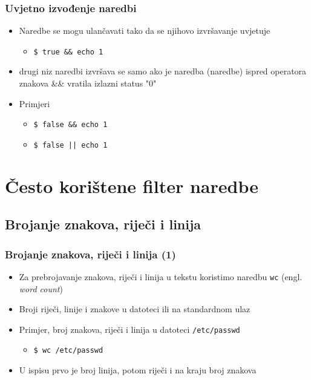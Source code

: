 \documentclass{beamer}
\newcommand{\shell}[1]{\texttt{#1}}
\begin{document}
\begin{frame}[t]
\frametitle{Uvjetno izvođenje naredbi}
\begin{itemize}
  \item Naredbe se mogu ulančavati tako da se njihovo izvršavanje uvjetuje
  \begin{itemize}
    \item[] \shell{\$ true \&\& echo 1}
  \end{itemize}
  \item drugi niz naredbi izvršava se samo ako je naredba (naredbe) ispred
        operatora znakova \&\& vratila izlazni status "0"
  \item Primjeri
  \begin{itemize}
    \item[] \shell{\$ false \&\& echo 1}
    \item[] \shell{\$ false || echo 1}
  \end{itemize}
\end{itemize}
\end{frame}

\section{Često korištene filter naredbe}
\subsection{Brojanje znakova, riječi i linija}
\begin{frame}[t]
\frametitle{Brojanje znakova, riječi i linija (1)}
\begin{itemize}
  \item Za prebrojavanje znakova, riječi i linija u tekstu koristimo 
        naredbu \shell{wc} (engl. \emph{word count})
  \item Broji riječi, linije i znakove u datoteci ili na standardnom ulaz 
  \item Primjer, broj znakova, riječi i linija u datoteci 
        \shell{/etc/passwd}
  \begin{itemize}
    \item[] \shell{\$ wc /etc/passwd}
  \end{itemize}
  \item U ispisu prvo je broj linija, potom riječi i na kraju broj znakova
\end{itemize}
\end{frame}
\end{document}
